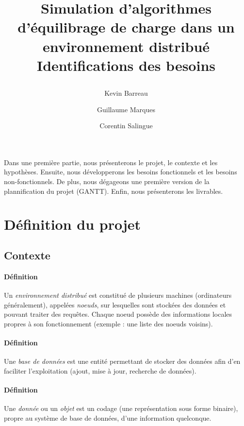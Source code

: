 \documentclass[12pt]{article}
\title{
 \begin{minipage}\linewidth
        \centering
        Simulation d'algorithmes d'équilibrage de charge dans un environnement distribué 
        \vskip3pt
        \large Identifications des besoins
    \end{minipage}
 }
\author{Kevin Barreau \and Guillaume Marques \and Corentin Salingue}
\begin{document}
\maketitle

\abstract
Dans une première partie, nous présenterons le projet, le contexte et les hypothèses. Ensuite, nous développerons les besoins fonctionnels et les besoins non-fonctionnels.
De plus, nous dégageons une première version de la plannification du projet (GANTT). Enfin, nous présenterons les livrables.



\newpage


\renewcommand{\contentsname}{Sommaire} 
\tableofcontents



\newpage

\section{Définition du projet}

\subsection{Contexte}

\paragraph{Définition} Un \textit{environnement distribué} est constitué de plusieurs machines (ordinateurs généralement), appelées \textit{noeuds}, sur lesquelles sont stockées des données et pouvant traiter des requêtes. Chaque noeud possède des informations locales propres à son fonctionnement (exemple : une liste des noeuds voisins).

\paragraph{Définition} Une \textit{base de données} est une entité permettant de stocker des données afin d'en faciliter l'exploitation (ajout, mise à jour, recherche de données).

\paragraph{Définition} Une \textit{donnée} ou un \textit{objet} est un codage (une représentation sous forme binaire), propre au système de base de données, d'une information quelconque.
\end{document}
